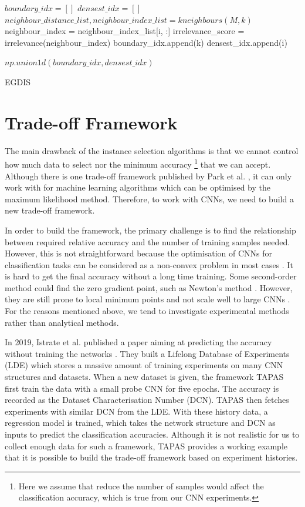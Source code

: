 \begin{algorithm}[H]
\label{EGDIS_code}

$boundary\_idx = []$ \;
$densest\_idx = []$ \;
$neighbour\_distance\_list, neighbour\_index\_list = kneighbours(M, k)$ \;
 {
 	neighbour\_index = neighbour\_index\_list[i, :] \;
	irrelevance\_score = irrelevance(neighbour\_index) \;
	 {
		boundary\_idx.append(k) \;
	}{ 
	{densest\_idx.append(i)}}
}

\Return $np.union1d(boundary\_idx, densest\_idx)$ \;

\caption{EGDIS}
\end{algorithm}

\section{Trade-off Framework}
The main drawback of the instance selection algorithms is that we cannot control how much data to select nor the minimum accuracy \footnote{Here we assume that reduce the number of samples would affect the classification accuracy, which is true from our CNN experiments.} that we can accept. Although there is one trade-off framework published by Park et al. \cite{Park2019a}, it can only work with for machine learning algorithms which can be optimised by the maximum likelihood method. Therefore, to work with CNNs, we need to build a new trade-off framework. 

In order to build the framework, the primary challenge is to find the relationship between required relative accuracy and the number of training samples needed. However, this is not straightforward because the optimisation of CNNs for classification tasks can be considered as a non-convex problem in most cases \cite[p.~114]{Goodfellow2016}. It is hard to get the final accuracy without a long time training. Some second-order method could find the zero gradient point, such as Newton’s method \cite{Xu2020}. However, they are still prone to local minimum points and not scale well to large CNNs \cite[p.~310]{Goodfellow2016}. For the reasons mentioned above, we tend to investigate experimental methods rather than analytical methods. 

In 2019, Istrate et al. published a paper aiming at predicting the accuracy without training the networks \cite{Istrate2019}. They built a Lifelong Database of Experiments (LDE) which stores a massive amount of training experiments on many CNN structures and datasets. When a new dataset is given, the framework TAPAS first train the data with a small probe CNN \cite{Scheidegger2018} for five epochs. The accuracy is recorded as the Dataset Characterisation Number (DCN). TAPAS then fetches experiments with similar DCN from the LDE. With these history data, a regression model is trained, which takes the network structure and DCN as inputs to predict the classification accuracies. Although it is not realistic for us to collect enough data for such a framework, TAPAS provides a working example that it is possible to build the trade-off framework based on experiment histories.